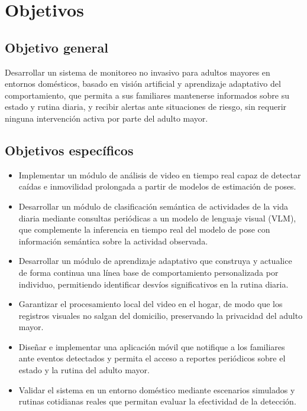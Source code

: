 \section{Objetivos}

\subsection*{Objetivo general}

Desarrollar un sistema de monitoreo no invasivo para adultos mayores en entornos domésticos, basado en visión artificial y aprendizaje adaptativo del comportamiento, que permita a sus familiares mantenerse informados sobre su estado y rutina diaria, y recibir alertas ante situaciones de riesgo, sin requerir ninguna intervención activa por parte del adulto mayor.

\subsection*{Objetivos específicos}

\begin{itemize}
    \item Implementar un módulo de análisis de video en tiempo real capaz de detectar caídas e inmovilidad prolongada a partir de modelos de estimación de poses.
    \item Desarrollar un módulo de clasificación semántica de actividades de la vida diaria mediante consultas periódicas a un modelo de lenguaje visual (VLM), que complemente la inferencia en tiempo real del modelo de pose con información semántica sobre la actividad observada.
    \item Desarrollar un módulo de aprendizaje adaptativo que construya y actualice de forma continua una línea base de comportamiento personalizada por individuo, permitiendo identificar desvíos significativos en la rutina diaria.
    \item Garantizar el procesamiento local del video en el hogar, de modo que los registros visuales no salgan del domicilio, preservando la privacidad del adulto mayor.
    \item Diseñar e implementar una aplicación móvil que notifique a los familiares ante eventos detectados y permita el acceso a reportes periódicos sobre el estado y la rutina del adulto mayor.
    \item Validar el sistema en un entorno doméstico mediante escenarios simulados y rutinas cotidianas reales que permitan evaluar la efectividad de la detección.
\end{itemize}
\vspace*{4pt}

